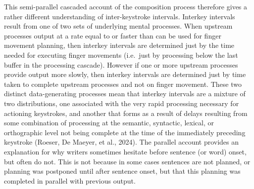 \documentclass[
  man,floatsintext]{apa7}
\begin{document}
This semi-parallel cascaded account of the composition process therefore gives a rather different understanding of inter-keystroke intervals. Interkey intervals result from one of two sets of underlying mental processes. When upstream processes output at a rate equal to or faster than can be used for finger movement planning, then interkey intervals are determined just by the time needed for executing finger movements (i.e.~just by processing below the last buffer in the processing cascade). However if one or more upstream processes provide output more slowly, then interkey intervals are determined just by time taken to complete upstream processes and not on finger movement. These two distinct data-generating processes mean that interkey intervals are a mixture of two distributions, one associated with the very rapid processing necessary for actioning keystrokes, and another that forms as a result of delays resulting from some combination of processing at the semantic, syntactic, lexical, or orthographic level not being complete at the time of the immediately preceding keystroke (Roeser, De Maeyer, et al., 2024). The parallel account provides an explanation for why writers sometimes hesitate before sentence (or word) onset, but often do not. This is not because in some cases sentences are not planned, or planning was postponed until after sentence onset, but that this planning was completed in parallel with previous output.
\end{document}
